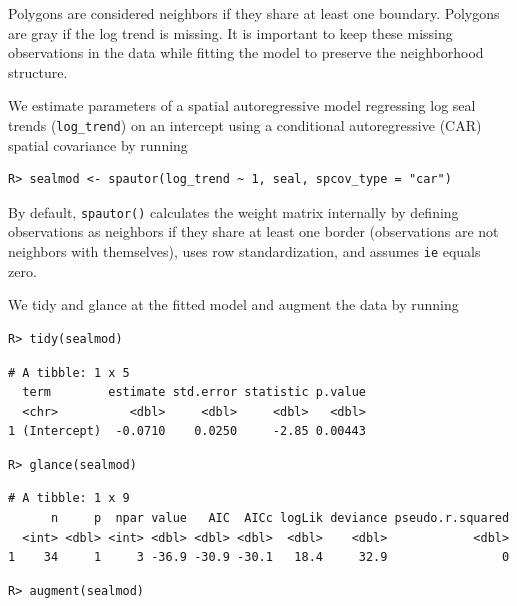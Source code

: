 \documentclass{article}
\begin{document}
Polygons are considered neighbors if they share at least one boundary.
Polygons are gray if the log trend is missing. It is important to keep
these missing observations in the data while fitting the model to
preserve the neighborhood structure.

We estimate parameters of a spatial autoregressive model regressing log
seal trends (\texttt{log\_trend}) on an intercept using a conditional
autoregressive (CAR) spatial covariance by running

\begin{verbatim}
R> sealmod <- spautor(log_trend ~ 1, seal, spcov_type = "car")
\end{verbatim}

By default, \texttt{spautor()} calculates the weight matrix internally
by defining observations as neighbors if they share at least one border
(observations are not neighbors with themselves), uses row
standardization, and assumes \texttt{ie} equals zero.

We tidy and glance at the fitted model and augment the data by running

\begin{verbatim}
R> tidy(sealmod)
\end{verbatim}

\begin{verbatim}
# A tibble: 1 x 5
  term        estimate std.error statistic p.value
  <chr>          <dbl>     <dbl>     <dbl>   <dbl>
1 (Intercept)  -0.0710    0.0250     -2.85 0.00443
\end{verbatim}

\begin{verbatim}
R> glance(sealmod)
\end{verbatim}

\begin{verbatim}
# A tibble: 1 x 9
      n     p  npar value   AIC  AICc logLik deviance pseudo.r.squared
  <int> <dbl> <int> <dbl> <dbl> <dbl>  <dbl>    <dbl>            <dbl>
1    34     1     3 -36.9 -30.9 -30.1   18.4     32.9                0
\end{verbatim}

\begin{verbatim}
R> augment(sealmod)
\end{verbatim}
\end{document}
